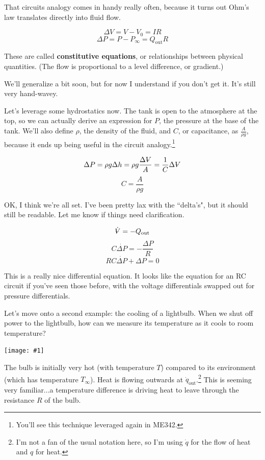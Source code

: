 \documentclass{report}
\newcommand{\Volume}{{\ooalign{\hfil$V$\hfil\cr\kern0.08em--\hfil\cr}}}
\newcommand{\bicture}[1]{
\begin{center}
    {\texttt{[image: \#1]}}
\end{center}}
\begin{document}
\begin{onehalfspacing}
\begin{flushleft}
\medskip

That circuits analogy comes in handy really often, because it turns out Ohm's law translates directly into fluid flow. 

\vspace{-0.1in}
\[\Delta V = V - V_0 = IR\]
\[\Delta P = P-P_\infty = Q_\text{out} R\]

These are called \textbf{constitutive equations}, or relationships between physical quantities. (The flow is proportional to a level difference, or gradient.)

\medskip

We'll generalize a bit soon, but for now I understand if you don't get it. It's still very hand-wavey.

\medskip

Let's leverage some hydrostatics now. The tank is open to the atmosphere at the top, so we can actually derive an expression for \(P\), the pressure at the base of the tank. We'll also define \(\rho\), the density of the fluid, and \(C\), or capacitance, as \(\frac{A}{\rho g}\), because it ends up being useful in the circuit analogy.\footnote{You'll see this technique leveraged again in ME342.}

\vspace{-0.1in}
\[\Delta P = \rho g \Delta h = \rho g \frac{\Delta \Volume}{A} = \frac{1}{C} \Delta \Volume\]
\[C = \frac{A}{\rho g}\]

OK, I think we're all set. I've been pretty lax with the ``delta's", but it should still be readable. Let me know if things need clarification.

\vspace{-0.1in}
\[\dot{\Volume} = -Q_\text{out}\]
\[C \dot{\Delta P} = - \frac{\Delta P}{R}\]
\[\boxed{RC \dot{\Delta P} + {\Delta P} = 0}\]

This is a really nice differential equation. It looks like the equation for an RC circuit if you've seen those before, with the voltage differentials swapped out for pressure differentials.

\medskip

Let's move onto a second example: the cooling of a lightbulb. When we shut off power to the lightbulb, how can we measure its temperature as it cools to room temperature?

\bicture{1_sys2}

The bulb is initially very hot (with temperature \(T\)) compared to its environment (which has temperature \(T_\infty\)). Heat is flowing outwards at \(\dot{q}_\text{out}\).\footnote{I'm not a fan of the usual notation here, so I'm using \(\dot{q}\) for the flow of heat and \(q\) for heat.} This is seeming very familiar...a temperature difference is driving heat to leave through the resistance \(R\) of the bulb.


\end{flushleft}
\end{onehalfspacing}
\end{document}
